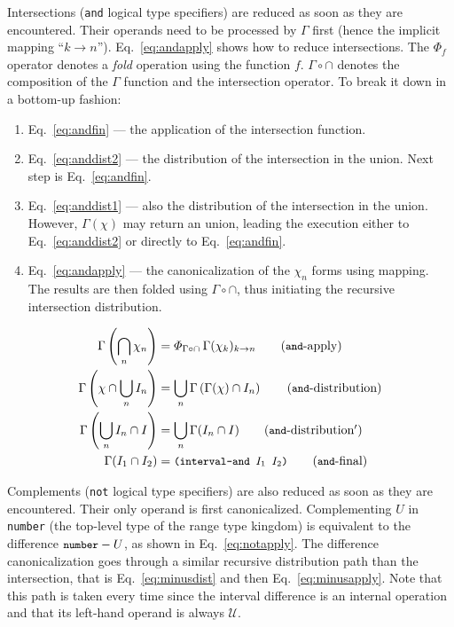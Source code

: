 \documentclass[format=sigconf]{acmart}
\newcommand\code[2][\small]{\sloppy\texttt{#1#2}}
\newcommand\mcode[2][\small]{\text{\code[#1]{#2}}}
\theoremstyle{definition}
\begin{document}
Intersections (\code{and} logical type specifiers) are reduced as soon as they
are encountered. Their operands need to be processed by $\Gamma$ first (hence
the implicit mapping ``$k \rightarrow n$''). Eq.~\ref{eq:andapply} shows how to
reduce intersections. The $\varPhi_f$ operator denotes a \emph{fold}
\cite{Hutton1999fold} operation using the function $f$. $\Gamma \circ \cap$
denotes the composition of the $\Gamma$ function and the intersection operator.
To break it down in a bottom-up fashion:
\begin{enumerate}
\item Eq.~\ref{eq:andfin} --- the application of the intersection function.
\item Eq.~\ref{eq:anddist2} --- the distribution of the intersection in the union.
  Next step is Eq.~\ref{eq:andfin}.
\item Eq.~\ref{eq:anddist1} --- also the distribution of the intersection in the
  union. However, $\Gamma(\chi)$ may return an union, leading the execution
  either to Eq.~\ref{eq:anddist2} or directly to Eq.~\ref{eq:andfin}.
\item Eq.~\ref{eq:andapply} --- the canonicalization of the $\chi_n$ forms using
  mapping. The results are then folded using $\Gamma \circ \cap$, thus
  initiating the recursive intersection distribution.
\end{enumerate}

\begin{align}
  \Gamma\left(\bigcap_n \chi_n\right) &= \varPhi_{\Gamma \circ \cap}\, \Gamma(\chi_k)_{k \rightarrow n} \label{eq:andapply}\tag{\code{and}-apply}\\
  \Gamma\left(\chi \cap \bigcup_n I_n\right) &= \bigcup_n \Gamma\left(\Gamma(\chi) \cap I_n\right) \label{eq:anddist1}\tag{\code{and}-distribution}\\
  \Gamma\left(\bigcup_n I_n \cap I\right) &= \bigcup_n \Gamma(I_n \cap I) \label{eq:anddist2}\tag{\code{and}-distribution$'$}\\
  \Gamma(I_1 \cap I_2) &= \mcode{(interval-and $I_1$ $I_2$)} \label{eq:andfin}\tag{\code{and}-final}
\end{align}

Complements (\code{not} logical type specifiers) are also reduced as soon as
they are encountered. Their only operand is first canonicalized. Complementing
$U$ in \code{number} (the top-level type of the range type kingdom) is
equivalent to the difference $\mcode{number} - U$, as shown in
Eq.~\ref{eq:notapply}. The difference canonicalization goes through a similar
recursive distribution path than the intersection, that is
Eq.~\ref{eq:minusdist} and then Eq.~\ref{eq:minusapply}. Note that this path is
taken every time since the interval difference is an internal operation and that
its left-hand operand is always $\mathcal{U}$.
\end{document}
